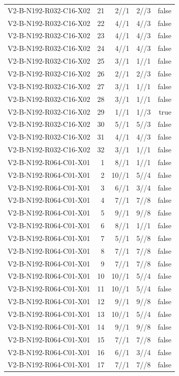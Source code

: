 {\begin{longtable}{lrrrr}
V2-B-N192-R032-C16-X02 & 21 & 2//1 & 2//3 & false \\
V2-B-N192-R032-C16-X02 & 22 & 4//1 & 4//3 & false \\
V2-B-N192-R032-C16-X02 & 23 & 4//1 & 4//3 & false \\
V2-B-N192-R032-C16-X02 & 24 & 4//1 & 4//3 & false \\
V2-B-N192-R032-C16-X02 & 25 & 3//1 & 1//1 & false \\
V2-B-N192-R032-C16-X02 & 26 & 2//1 & 2//3 & false \\
V2-B-N192-R032-C16-X02 & 27 & 3//1 & 1//1 & false \\
V2-B-N192-R032-C16-X02 & 28 & 3//1 & 1//1 & false \\
V2-B-N192-R032-C16-X02 & 29 & 1//1 & 1//3 & true \\
V2-B-N192-R032-C16-X02 & 30 & 5//1 & 5//3 & false \\
V2-B-N192-R032-C16-X02 & 31 & 4//1 & 4//3 & false \\
V2-B-N192-R032-C16-X02 & 32 & 3//1 & 1//1 & false \\
V2-B-N192-R064-C01-X01 & 1 & 8//1 & 1//1 & false \\
V2-B-N192-R064-C01-X01 & 2 & 10//1 & 5//4 & false \\
V2-B-N192-R064-C01-X01 & 3 & 6//1 & 3//4 & false \\
V2-B-N192-R064-C01-X01 & 4 & 7//1 & 7//8 & false \\
V2-B-N192-R064-C01-X01 & 5 & 9//1 & 9//8 & false \\
V2-B-N192-R064-C01-X01 & 6 & 8//1 & 1//1 & false \\
V2-B-N192-R064-C01-X01 & 7 & 5//1 & 5//8 & false \\
V2-B-N192-R064-C01-X01 & 8 & 7//1 & 7//8 & false \\
V2-B-N192-R064-C01-X01 & 9 & 7//1 & 7//8 & false \\
V2-B-N192-R064-C01-X01 & 10 & 10//1 & 5//4 & false \\
V2-B-N192-R064-C01-X01 & 11 & 10//1 & 5//4 & false \\
V2-B-N192-R064-C01-X01 & 12 & 9//1 & 9//8 & false \\
V2-B-N192-R064-C01-X01 & 13 & 10//1 & 5//4 & false \\
V2-B-N192-R064-C01-X01 & 14 & 9//1 & 9//8 & false \\
V2-B-N192-R064-C01-X01 & 15 & 7//1 & 7//8 & false \\
V2-B-N192-R064-C01-X01 & 16 & 6//1 & 3//4 & false \\
V2-B-N192-R064-C01-X01 & 17 & 7//1 & 7//8 & false \\

\end{longtable}}
